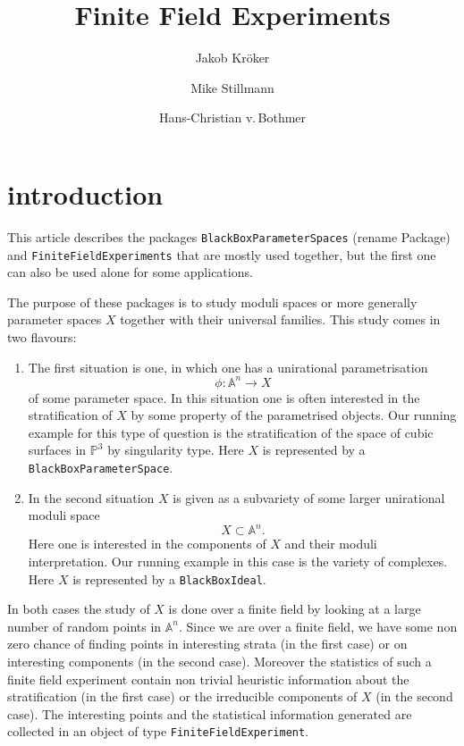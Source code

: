 \documentclass[12pt,a4paper]{amsart}
\theoremstyle{plain}
\theoremstyle{definition}
\renewcommand{\AA}{\mathbb A}
\newcommand{\PP}{\mathbb P}
\begin{document}
\title{Finite Field Experiments}

\author{Jakob Kr\"oker}
\author{Mike Stillmann}
\author{Hans-Christian v.\,Bothmer}

\maketitle

\section{introduction}

This article describes the packages {\tt BlackBoxParameterSpaces} {\color{red} (rename Package)} and
 {\tt FiniteFieldExperiments} that are mostly used together, but the first one can also be used alone for some applications.

The purpose of these packages is to study moduli spaces or more generally parameter spaces $X$ together with their universal families. This study comes in two flavours:

\begin{enumerate}
\item The first situation is one, in which one has a unirational parametrisation 
\[
	\phi \colon \AA^n \to X
\]
of some parameter space. In this situation one is often interested in the stratification of $X$ by some property of the parametrised objects. Our running example for this type of question is the stratification of the space of cubic surfaces in $\PP^3$ by singularity type. Here $X$ is represented by a {\tt BlackBoxParameterSpace}.

\item In the second situation $X$ is given as a subvariety of some larger unirational moduli space
\[
	X \subset \AA^n.
\]
Here one is interested in the components of $X$ and their moduli interpretation. Our running example in this case is the variety of complexes. Here $X$ is represented by a {\tt BlackBoxIdeal}.
\end{enumerate}

In both cases the study of $X$ is done over a finite field by looking at a large number of random points in $\AA^n$. Since we are over a finite field, we have some non zero chance of finding points in interesting strata (in the first case) or on interesting components (in the second case). Moreover the statistics of such a finite field experiment contain non trivial heuristic information about the stratification (in the first case) or the irreducible components of $X$ (in the second case). The interesting points and the statistical information generated are collected in an object of type {\tt FiniteFieldExperiment}.
\end{document}
